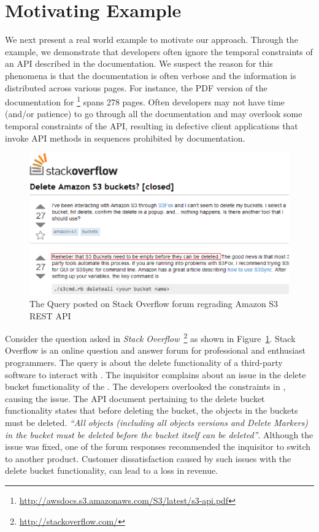 \section{Motivating Example}
\label{sec:example}

We next present a real world example to motivate our approach.
Through the example, we demonstrate that developers often ignore the temporal constraints of an API described in the documentation.
We suspect the reason for this phenomena is that the documentation is often verbose and the information is distributed across various pages.
For instance, the PDF version of the documentation for \amazonAPI\footnote{{\small \url{http://awsdocs.s3.amazonaws.com/S3/latest/s3-api.pdf}}} spans 278 pages.
Often developers may not have time (and/or patience) to go through all the documentation and may overlook some temporal constraints of the API,
resulting in defective client applications that invoke API methods in sequences prohibited by documentation. 

\begin{figure}[t]
	\begin{center}
		\includegraphics[scale=0.45]{Stackoverflow.eps}
	\end{center}
	\caption{\label{fig:Stackoverflow} The Query posted on Stack Overflow forum regrading Amazon S3 REST API}
\end{figure}

Consider the question asked in \textit{Stack Overflow}~\footnote{{\small \url{http://stackoverflow.com/}}} as shown in Figure~\ref{fig:Stackoverflow}.
Stack Overflow is an online question and answer forum for professional and enthusiast programmers.
The query is about the delete functionality of a third-party software  to interact with \amazonAPI.
The inquisitor complains about an issue in the delete bucket functionality of the .
The  developers overlooked the constraints in \amazon, causing the issue.
The API document pertaining to the  delete bucket functionality states that before deleting the bucket, the objects in the buckets must be deleted.
\textit{``All objects (including all objects versions and Delete Markers) in the bucket must be deleted before the bucket itself can be deleted''}.
Although the issue was fixed, one of the forum responses recommended the inquisitor to switch to another product.
Customer dissatisfaction caused by such issues with the delete bucket functionality, can lead to a loss in revenue.
 
